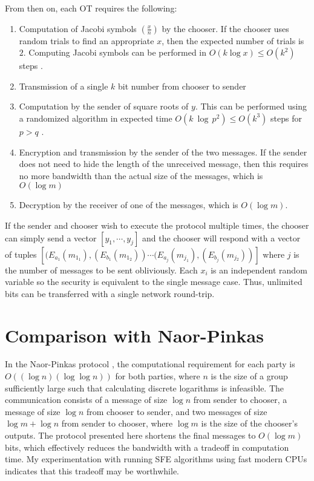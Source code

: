 From then on, each OT requires the following: 
\begin{enumerate}
\item Computation of Jacobi symbols $\left(\frac{x}{n}\right)$ by the chooser.
If the chooser uses random trials to find an appropriate $x$, then
the expected number of trials is $2$. Computing Jacobi symbols can
be performed in $O(k\log x)\le O(k^{2})$ steps \cite{1996-bach-book}.

\item Transmission of a single $k$ bit number from chooser to sender 
\item Computation by the sender of square roots of $y$. This can be performed
using a randomized algorithm in expected time $O(k\ \log\, p^{2})\le O(k^{3})$
steps for $p>q$ \cite{1996-bach-book}. 
\item Encryption and transmission by the sender of the two messages. If
the sender does not need to hide the length of the unreceived message,
then this requires no more bandwidth than the actual size of the messages,
which is $O(\log m)$ 
\item Decryption by the receiver of one of the messages, which is $O(\log m)$. 
\end{enumerate}
If the sender and chooser wish to execute the protocol multiple times,
the chooser can simply send a vector $[y_{1},\cdots,y_{j}]$ and the
chooser will respond with a vector of tuples $[(E_{a_{1}}(m_{1_{1}}),(E_{b_{1}}(m_{1_{2}}))\cdots(E_{a_{j}}(m_{j_{1}}),(E_{b_{j}}(m_{j{}_{2}}))]$
where $j$ is the number of messages to be sent obliviously. Each
$x_{i}$ is an independent random variable so the security is equivalent
to the single message case. Thus, unlimited bits can be transferred
with a single network round-trip.


\section{Comparison with Naor-Pinkas\label{sub:Comparison-with-Naor-Pinkas}}

In the Naor-Pinkas protocol \cite{Noar-Pinkas:2001}, the computational
requirement for each party is $O((\log n)(\log\log n))$ for both
parties, where $n$ is the size of a group sufficiently large such
that calculating discrete logarithms is infeasible. The communication
consists of a message of size $\log n$ from sender to chooser, a
message of size $\log n$ from chooser to sender, and two messages
of size $\log m+\log n$ from sender to chooser, where $\log m$ is
the size of the chooser's outputs. The protocol presented here shortens
the final messages to $O(\log m)$ bits, which effectively reduces
the bandwidth with a tradeoff in computation time. My experimentation
with running SFE algorithms using fast modern CPUs indicates that
this tradeoff may be worthwhile.


